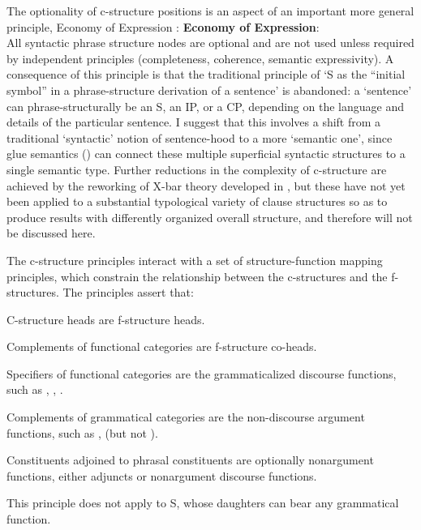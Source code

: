 \documentclass[output=paper,hidelinks]{langscibook}
\begin{document}
The optionality of c-structure positions is an aspect of an important more
general principle, Economy of Expression \citep[90]{BresnanEtAl2016}:
\ea
{\bf Economy of Expression}:\\
All syntactic phrase structure nodes are optional and are not used unless
required by independent principles (completeness, coherence, semantic expressivity).
\z
A consequence of this principle is that the traditional principle
of `S as the ``initial symbol'' in a phrase-structure derivation of a sentence'
is abandoned: a `sentence' can phrase-structurally
be an S, an IP, or a CP, depending on the language and details of the particular
sentence.
I suggest that this involves a shift from a traditional `syntactic' notion
of sentence-hood to a more `semantic one', since glue semantics ()
can connect these multiple superficial syntactic structures to a single
semantic type.  Further reductions in the complexity of c-structure are
achieved by the reworking of X-bar theory developed in \citet{lovestrand-lowe2017},
but these have not yet been applied to a substantial typological variety of
clause structures so as to produce results with differently organized overall
structure, and therefore will not be discussed here.

The c-structure principles interact with a set of structure-function
mapping principles, which constrain the relationship between the
c-structures and the f-structures.  The principles
\citep[105-109]{BresnanEtAl2016} assert that:
\ea\label{structurefunction}
\begin{xlist}
\item C-structure heads are f-structure heads.
\item Complements of functional categories are f-structure co-heads.
\item Specifiers of functional categories are the grammaticalized discourse
functions, such as \SUBJ, \FOC, \TOP.
\item Complements of grammatical categories are the non-discourse argument
functions, such as \OBJ, \OBJTHETA (but not \SUBJ).
\item Constituents adjoined to phrasal constituents are optionally nonargument
functions, either adjuncts or nonargument discourse functions.
\end{xlist}
\z
This principle does not apply to S, whose daughters can bear any grammatical function.
\end{document}
